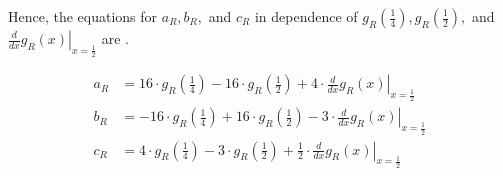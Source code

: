 Hence, the equations for $a_R, b_R,$ and $c_R$ in dependence of $g_R\left(\frac{1}{4}\right), g_R\left(\frac{1}{2}\right),$ and $\left. \frac{d}{dx} g_R\left(x\right) \right|_{x = \frac{1}{2}}$ are .

\begin{align}
	a_R & = 16 \cdot g_R\left(\frac{1}{4}\right) - 16 \cdot g_R\left(\frac{1}{2}\right) + 4 \cdot \left. \frac{d}{dx} g_R\left(x\right) \right|_{x = \frac{1}{2}}     \label{equ:setup.quad.hyper.aR}     \\
	b_R & = -16 \cdot g_R\left(\frac{1}{4}\right) + 16 \cdot g_R\left(\frac{1}{2}\right) - 3 \cdot \left. \frac{d}{dx} g_R\left(x\right) \right|_{x = \frac{1}{2}} \label{equ:setup.quad.hyper.bR}        \\
	c_R & = 4 \cdot g_R\left(\frac{1}{4}\right) - 3 \cdot g_R\left(\frac{1}{2}\right) + \frac{1}{2} \cdot \left. \frac{d}{dx} g_R\left(x\right) \right|_{x = \frac{1}{2}} \label{equ:setup.quad.hyper.cR}
\end{align}
